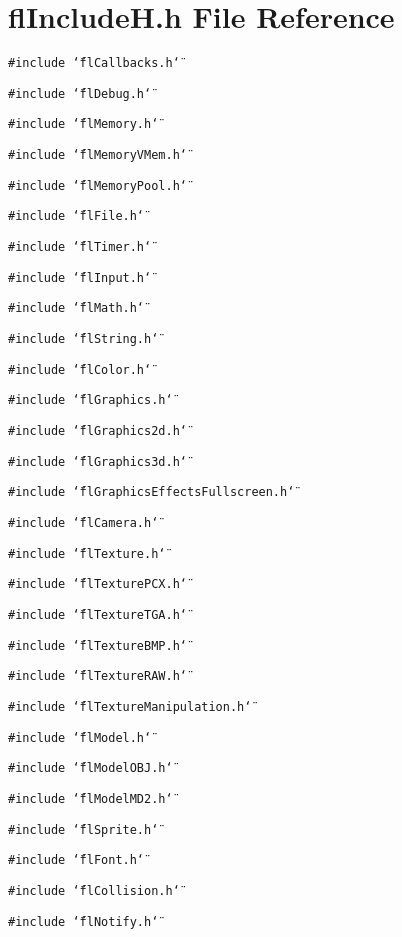 \section{fl\-Include\-H.h File Reference}
\label{flIncludeH_8h}
{\tt \#include \char`\"{}fl\-Callbacks.h\char`\"{}}\par
{\tt \#include \char`\"{}fl\-Debug.h\char`\"{}}\par
{\tt \#include \char`\"{}fl\-Memory.h\char`\"{}}\par
{\tt \#include \char`\"{}fl\-Memory\-VMem.h\char`\"{}}\par
{\tt \#include \char`\"{}fl\-Memory\-Pool.h\char`\"{}}\par
{\tt \#include \char`\"{}fl\-File.h\char`\"{}}\par
{\tt \#include \char`\"{}fl\-Timer.h\char`\"{}}\par
{\tt \#include \char`\"{}fl\-Input.h\char`\"{}}\par
{\tt \#include \char`\"{}fl\-Math.h\char`\"{}}\par
{\tt \#include \char`\"{}fl\-String.h\char`\"{}}\par
{\tt \#include \char`\"{}fl\-Color.h\char`\"{}}\par
{\tt \#include \char`\"{}fl\-Graphics.h\char`\"{}}\par
{\tt \#include \char`\"{}fl\-Graphics2d.h\char`\"{}}\par
{\tt \#include \char`\"{}fl\-Graphics3d.h\char`\"{}}\par
{\tt \#include \char`\"{}fl\-Graphics\-Effects\-Fullscreen.h\char`\"{}}\par
{\tt \#include \char`\"{}fl\-Camera.h\char`\"{}}\par
{\tt \#include \char`\"{}fl\-Texture.h\char`\"{}}\par
{\tt \#include \char`\"{}fl\-Texture\-PCX.h\char`\"{}}\par
{\tt \#include \char`\"{}fl\-Texture\-TGA.h\char`\"{}}\par
{\tt \#include \char`\"{}fl\-Texture\-BMP.h\char`\"{}}\par
{\tt \#include \char`\"{}fl\-Texture\-RAW.h\char`\"{}}\par
{\tt \#include \char`\"{}fl\-Texture\-Manipulation.h\char`\"{}}\par
{\tt \#include \char`\"{}fl\-Model.h\char`\"{}}\par
{\tt \#include \char`\"{}fl\-Model\-OBJ.h\char`\"{}}\par
{\tt \#include \char`\"{}fl\-Model\-MD2.h\char`\"{}}\par
{\tt \#include \char`\"{}fl\-Sprite.h\char`\"{}}\par
{\tt \#include \char`\"{}fl\-Font.h\char`\"{}}\par
{\tt \#include \char`\"{}fl\-Collision.h\char`\"{}}\par
{\tt \#include \char`\"{}fl\-Notify.h\char`\"{}}\par
